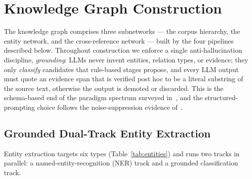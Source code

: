 
\section{Knowledge Graph Construction}
\label{sec:kg}

The knowledge graph comprises three subnetworks --- the corpus hierarchy,
the entity network, and the cross-reference network --- built by the four
pipelines described below. Throughout construction we enforce a single
anti-hallucination discipline, \emph{grounding}: LLMs never invent
entities, relation types, or evidence; they only \emph{classify}
candidates that rule-based stages propose, and every LLM output must quote
an evidence span that is verified post hoc to be a literal substring of
the source text, otherwise the output is demoted or discarded. This is the
schema-based end of the paradigm spectrum surveyed
in~\cite{bian2025kgsurvey}, and the structured-prompting choice follows
the noise-suppression evidence of~\cite{meher2025corekg,meher2025insidecorekg}.

\subsection{Grounded Dual-Track Entity Extraction}
\label{sec:entity}

Entity extraction targets six types (Table~\ref{tab:entities}) and runs
two tracks in parallel: a named-entity-recognition (NER) track and a
grounded classification track.

